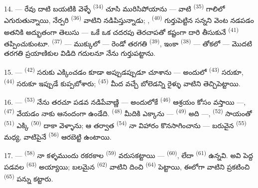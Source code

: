 \VUsaut{5.0mm}
\VUsaut{3.4mm}

14. --- రేవు దాటి బయటికి వెళ్ళే  \textsuperscript{(34)} చూసి
మురిసిపోయాను — వాటి  \textsuperscript{(35)} గాలిలో ఎగురుతున్నాయి, నేర్పరి
 \textsuperscript{(36)} వాటిని నడిపిస్తున్నాడు; ,
 \textsuperscript{(40)} గుర్తుపెట్టిన సన్నని  వెంట
నడపడం అతనికి అద్భుతంగా తెలుసు — ఒకే ఒక చదరపు తెరచాపతో కష్టంగా దారి తీసుకునే
 \textsuperscript{(41)} తప్పించుకుంటూ. 
\textsuperscript{(37)} — ముక్కులో — రెండో తరగతి  \textsuperscript{(39)}, ఇంకా
 \textsuperscript{(38)} — తోకలో — మొదటి తరగతి ప్రయాణికుల విడిది గదులనూ
నేను గుర్తుపట్టాను.

15. ---  \textsuperscript{(42)} సరుకు ఎక్కించడం కూడా అప్పుడప్పుడూ
చూశాను — అందులో  \textsuperscript{(43)} సరుకూ, 
\textsuperscript{(44)} సరుకూ ఇప్పుడే కుప్పబోశారు; 
\textsuperscript{(45)} మీద వచ్చే బోలెడన్ని రైళ్ళు వాటిని తెచ్చిపెట్టాయి.

\VUsaut{5.0mm}
\VUsaut{3.4mm}

16. ---  \textsuperscript{(53)} నేను తరచూ పడవ నడిపేవాణ్ణి — అందులోకే
 \textsuperscript{(46)} ఆశ్రయం కోసం వస్తాయి —, 
\textsuperscript{(47)} వేయడం నాకు ఆనందంగా ఉండేది.  \textsuperscript{(48)} మీదికి
ఎక్కాను —  \textsuperscript{(49)} అది —, 
\textsuperscript{(52)} సాయంతో  \textsuperscript{(51)} ఎక్కి
 \textsuperscript{(50)} దాకా వెళ్ళాను; ఆ తర్వాత 
\textsuperscript{(54)} నా విహారం కొనసాగించాను — బరువైన 
\textsuperscript{(55)} మధ్య, వాటిపైనే  \textsuperscript{(56)} ఆరబెట్టి ఉంటాయి.

17. ---  \textsuperscript{(58)} నా కళ్ళముందు రకరకాల 
\textsuperscript{(59)} వరుసకట్టాయి —  \textsuperscript{(60)}, లేదా
 \textsuperscript{(61)} ఉన్నవి. అవి పెద్ద పడవల 
\textsuperscript{(63)} అయ్యాయి; బలమైన  \textsuperscript{(62)} వాటిని దించి
 \textsuperscript{(64)} పెట్టాయి, ఈలోగా  వాటిని
ప్రకటించి  \textsuperscript{(65)} పన్ను కట్టారు.

